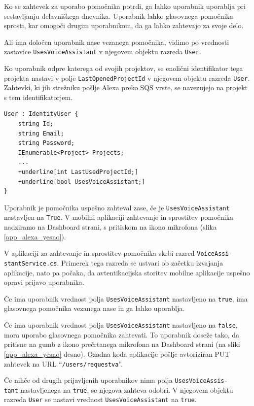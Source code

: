 \documentclass[a4paper, 12pt]{book}
\begin{document}
Ko se zahtevek za uporabo pomočnika potrdi, ga lahko uporabnik uporablja pri sestavljanju delavniškega dnevnika.
Uporabnik lahko glasovnega pomočnika sprosti, kar omogoči drugim uporabnikom, da ga lahko zahtevajo za svoje delo.

Ali ima določen uporabnik nase vezanega pomočnika, vidimo po vrednosti zastavice \texttt{UsesVoiceAssistant} v njegovem objektu razreda \texttt{User}.

Ko uporabnik odpre katerega od svojih projektov, se enolični identifikator tega projekta nastavi v polje \texttt{LastOpenedProjectId} v njegovem objektu razreda \texttt{User}.
Zahtevki, ki jih strežniku pošlje Alexa preko SQS vrste, se navezujejo na projekt s tem identifikatorjem.

\begin{Verbatim}[commandchars=+\[\]]
User : IdentityUser {
    string Id; 
    string Email;
    string Password; 
    IEnumerable<Project> Projects;
    ... 
    +underline[int LastUsedProjectId;]
    +underline[bool UsesVoiceAssistant;]
}
\end{Verbatim}

Uporabnik je pomočnika uspešno zahteval zase, če je \texttt{UsesVoiceAssistant} nastavljen na \texttt{True}.
V mobilni aplikaciji zahtevanje in sprostitev pomočnika nadziramo na {Dashboard} strani, s pritiskom na ikono mikrofona (slika \ref{app_alexa_yesno}).

V aplikaciji za zahtevanje in sprostitev pomočnika skrbi razred \texttt{VoiceAssi-\\stantService.cs}.
Primerek tega razreda se ustvari ob začetku izvajanja aplikacije, nato pa počaka, da avtentikacijska storitev mobilne aplikacije uspešno opravi prijavo uporabnika.

Če ima uporabnik vrednost polja \texttt{UsesVoiceAssistant} nastavljeno na \texttt{true}, ima glasovnega pomočnika vezanega nase in ga lahko uporablja.

Če ima uporabnik vrednost polja \texttt{UsesVoiceAssistant} nastavljeno na \texttt{false}, mora uporabo glasovnega pomočnika zahtevati.
To uporabnik doseže tako, da pritisne na gumb z ikono prečrtanega mikrofona na Dashboard strani (na sliki \ref{app_alexa_yesno} desno).
Ozadna koda aplikacije pošlje avtoriziran PUT zahtevek na URL \enquote{\texttt{/users/requestva}}.

Če nihče od drugih prijavljenih uporabnikov nima polja \texttt{UsesVoiceAssis-\\tant} nastavljenega na \texttt{true}, se njegova zahteva odobri.
V njegovem objektu razreda \texttt{User} se nastavi vrednost \texttt{UsesVoiceAssistant} na \texttt{true}.
\end{document}
